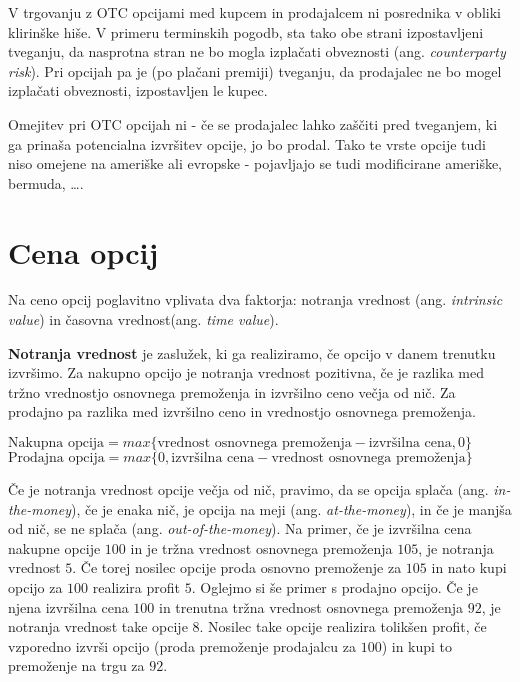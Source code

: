 \documentclass[a4paper]{article}
\begin{document}
V trgovanju z OTC opcijami med kupcem in prodajalcem ni posrednika v obliki klirinške hiše. V primeru terminskih pogodb, sta tako
obe strani izpostavljeni tveganju, da nasprotna stran ne bo mogla izplačati obveznosti (ang. \textit{counterparty risk}). Pri opcijah
pa je (po plačani premiji) tveganju, da prodajalec ne bo mogel izplačati obveznosti, izpostavljen le kupec.

Omejitev pri OTC opcijah ni - če se prodajalec lahko zaščiti pred tveganjem, ki ga prinaša potencialna izvršitev opcije, jo bo prodal.
Tako te vrste opcije tudi niso omejene na ameriške ali evropske - pojavljajo se tudi modificirane ameriške, bermuda, \ldots.

\section{Cena opcij} \label{cenaopcij}
Na ceno opcij poglavitno vplivata dva faktorja: notranja vrednost (ang. \textit{intrinsic value}) in časovna vrednost(ang. \textit{time value}).

\textbf{Notranja vrednost} je zaslužek, ki ga realiziramo, če opcijo v danem trenutku izvršimo.
Za nakupno opcijo je notranja vrednost pozitivna, če je razlika med tržno vrednostjo osnovnega premoženja in izvršilno ceno večja od nič. Za prodajno
pa razlika med izvršilno ceno in vrednostjo osnovnega premoženja.
\begin{center}
    $\text{Nakupna opcija} = max\{\text{vrednost osnovnega premoženja} - \text{izvršilna cena}, 0\}$ \\
    $\text{Prodajna opcija} = max\{0, \text{izvršilna cena} - \text{vrednost osnovnega premoženja}\}$
\end{center}
Če je notranja vrednost opcije večja od nič, pravimo, da se opcija splača (ang. \textit{in-the-money}), če je enaka nič, je opcija na meji (ang. \textit{at-the-money}),
in če je manjša od nič, se ne splača (ang. \textit{out-of-the-money}).
Na primer, če je izvršilna cena nakupne opcije \textdollar$100$ in je tržna vrednost osnovnega premoženja \textdollar$105$, je notranja vrednost \textdollar$5$. 
Če torej nosilec opcije proda osnovno premoženje za \textdollar$105$ in nato kupi opcijo za \textdollar$100$ realizira profit \textdollar$5$.
Oglejmo si še primer s prodajno opcijo. Če je njena izvršilna cena \textdollar$100$ in trenutna tržna vrednost osnovnega premoženja \textdollar$92$, je notranja 
vrednost take opcije \textdollar$8$. Nosilec take opcije realizira tolikšen profit, če vzporedno izvrši opcijo (proda premoženje prodajalcu za \textdollar$100$) in
kupi to premoženje na trgu za \textdollar$92$.
\end{document}
